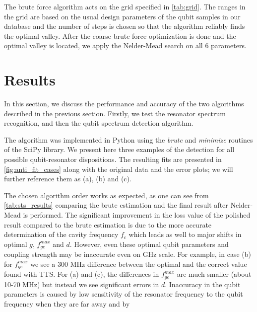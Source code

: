 \documentclass[%
 aip,
 draft,
 amsmath,amssymb,
 reprint,%
]{revtex4-1}
\begin{document}
The brute force algorithm acts on the grid specified in \autoref{tab:grid}. The ranges in the grid are based on the usual design parameters of the qubit samples in our database and the number of steps is chosen so that the algorithm reliably finds the optimal valley. After the coarse brute force optimization is done and the optimal valley is located, we apply the Nelder-Mead search on all 6 parameters.


\section{Results}

In this section, we discuss the performance and accuracy of the two algorithms described in the previous section. Firstly, we test the resonator spectrum recognition, and then the qubit spectrum detection algorithm.

The algorithm was implemented in Python using the \textit{brute} and \textit{minimize} routines of the SciPy\cite{scipy} library. We present here three examples of the detection for all possible qubit-resonator dispositions.  The resulting fits are presented in \autoref{fig:anti_fit_cases} along with the original data and the error plots; we will further reference them as (a), (b) and (c). 

The chosen algorithm order works as expected, as one can see from \autoref{tab:sts_results} comparing the brute estimation and  the final result after Nelder-Mead is performed. 	The significant improvement in the loss value of the polished result compared to the brute estimation is due to the more accurate determination of the cavity frequency $f_c$ which leads as well to major shifts in optimal $g$, $f_{ge}^{max}$ and $d$. However, even these optimal qubit parameters and coupling strength may be inaccurate even on GHz scale. For example, in case (b) for $f_{ge}^{max}$ we see a 300 MHz difference between the optimal and the correct value found with TTS. For (a) and (c), the differences in $f_{ge}^{max}$ are much smaller (about 10-70 MHz) but instead we see significant errors in $d$. Inaccuracy in the qubit parameters is caused by low sensitivity of the resonator frequency to the qubit frequency when they are far away and by 
\end{document}
